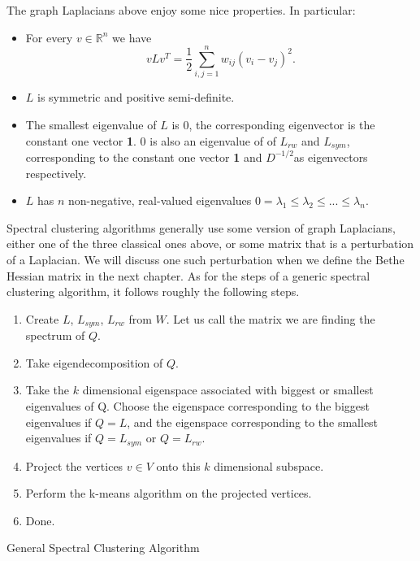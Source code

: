 The graph Laplacians above enjoy some nice properties.  In particular: 

\begin{prop}{\cite{tutorial_SC}}
\begin{itemize}
    \item For every $v \in \mathbb{R}^n$ we have
    $$v L v^T = \frac{1}{2}\sum_{i,j =1}^nw_{ij}(v_i-v_j)^2.$$
    \item $L$ is symmetric and positive semi-definite.
    \item The smallest eigenvalue of $L$ is 0, the corresponding eigenvector is the constant one vector \textbf{1}. $0$ is also an eigenvalue of of $L_{rw}$ and $L_{sym}$, corresponding to the constant one vector \textbf{1} and $D^{-1/2}$as eigenvectors respectively. 
    \item $L$ has $n$ non-negative, real-valued eigenvalues $0 = \lambda_1 \leq \lambda_2 \leq ...\leq \lambda_n$. 
\end{itemize}
\end{prop}

 Spectral clustering algorithms generally use some version of graph Laplacians, either one of the three classical ones above, or some matrix that is a perturbation of a Laplacian.  We will discuss one such perturbation when we define the Bethe Hessian matrix in the next chapter.  As for the steps of a generic spectral clustering algorithm, it follows roughly the following steps.  

\begin{algorithm}[H]
 \begin{enumerate}
    \item Create $L$, $L_{sym}$, $L_{rw}$ from $W$.  Let us call the matrix we are finding the spectrum of $Q$. 
    \item Take eigendecomposition of $Q$.  
    \item Take the $k$ dimensional eigenspace associated with biggest or smallest eigenvalues of Q. Choose the eigenspace corresponding to the biggest eigenvalues if $Q = L$, and the eigenspace corresponding to the smallest eigenvalues if $Q= L_{sym}$ or $Q = L_{rw}$.  
    \item Project the vertices $v \in V$ onto this $k$ dimensional subspace.
    \item Perform the k-means algorithm on the projected vertices. 
    \item Done. 
 \end{enumerate}
 \caption{General Spectral Clustering Algorithm}
\end{algorithm}


